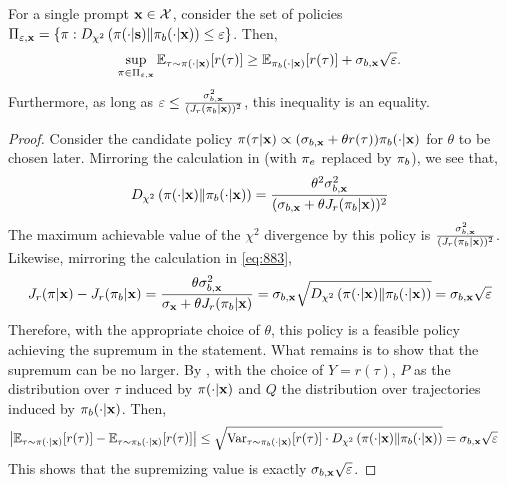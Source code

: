 \begin{lemma} \label{lemma:characterization} For a single prompt $\mathbf{x} \in \mathcal{X}$, consider the set of policies $\Pi_{\varepsilon,\mathbf{x}} = \{ \pi : D_{\chi^2} \left( \pi(\cdot|\mathbf{s}) \| \pi_b(\cdot|\mathbf{x}) \right) \le \varepsilon \}$. Then,
\begin{equation}
    \sup_{\pi \in \Pi_{\varepsilon,\mathbf{x}}} \mathbb{E}_{\tau \sim \pi(\cdot|\mathbf{x})} [r(\tau)] \ge \mathbb{E}_{\pi_b(\cdot|\mathbf{x})} [r(\tau)] + \sigma_{b,\mathbf{x}} \sqrt{\varepsilon}.
\end{equation}
Furthermore, as long as $\varepsilon \le \frac{\sigma_{b,\mathbf{x}}^2}{(J_r(\pi_b|\mathbf{x}))^2}$, this inequality is an equality.
\end{lemma}
\begin{proof}
Consider the candidate policy $\pi (\tau|\mathbf{x}) \propto (\sigma_{b,\mathbf{x}} + \theta r(\tau)) \pi_b(\cdot|\mathbf{x})$ for $\theta$ to be chosen later. Mirroring the calculation in  (with $\pi_e$ replaced by $\pi_b$), we see that,
\begin{align*}
    D_{\chi^2} \left( \pi(\cdot|\mathbf{x}) \| \pi_b(\cdot|\mathbf{x}) \right) = \frac{\theta^2 \sigma_{b,\mathbf{x}}^2}{(\sigma_{b,\mathbf{x}} + \theta J_r (\pi_b|\mathbf{x}))^2}
\end{align*}
The maximum achievable value of the $\chi^2$ divergence by this policy is $\frac{\sigma_{b,\mathbf{x}}^2}{(J_r (\pi_b|\mathbf{x}))^2}$. Likewise, mirroring the calculation in \cref{eq:883},
\begin{align*}
    J_r (\pi|\mathbf{x}) - J_r(\pi_b|\mathbf{x}) = \frac{\theta \sigma_{b,\mathbf{x}}^2}{\sigma_{\mathbf{x}} + \theta J_r(\pi_b|\mathbf{x})} = \sigma_{b,\mathbf{x}} \sqrt{D_{\chi^2} \left( \pi(\cdot|\mathbf{x}) \| \pi_b(\cdot|\mathbf{x}) \right)} = \sigma_{b,\mathbf{x}} \sqrt{\varepsilon}
\end{align*}
Therefore, with the appropriate choice of $\theta$, this policy is a feasible policy achieving the supremum in the statement. What remains is to show that the supremum can be no larger. By , with the choice of $Y = r(\tau)$, $P$ as the distribution over $\tau$ induced by $\pi(\cdot|\mathbf{x})$ and $Q$ the distribution over trajectories induced by $\pi_b(\cdot|\mathbf{x})$. Then,
\begin{align*}
    \left| \mathbb{E}_{\tau \sim \pi(\cdot|\mathbf{x})} [r(\tau)] - \mathbb{E}_{\tau \sim \pi_b(\cdot|\mathbf{x})} [r(\tau)] \right| &\le \sqrt{\mathrm{Var}_{\tau \sim \pi_b(\cdot|\mathbf{x})} [r(\tau)] \cdot D_{\chi^2} \left( \pi(\cdot|\mathbf{x}) \| \pi_b(\cdot|\mathbf{x}) \right)} = \sigma_{b,\mathbf{x}} \sqrt{\varepsilon}
\end{align*}
This shows that the supremizing value is exactly $\sigma_{b,\mathbf{x}} \sqrt{\varepsilon}$.
\end{proof}


